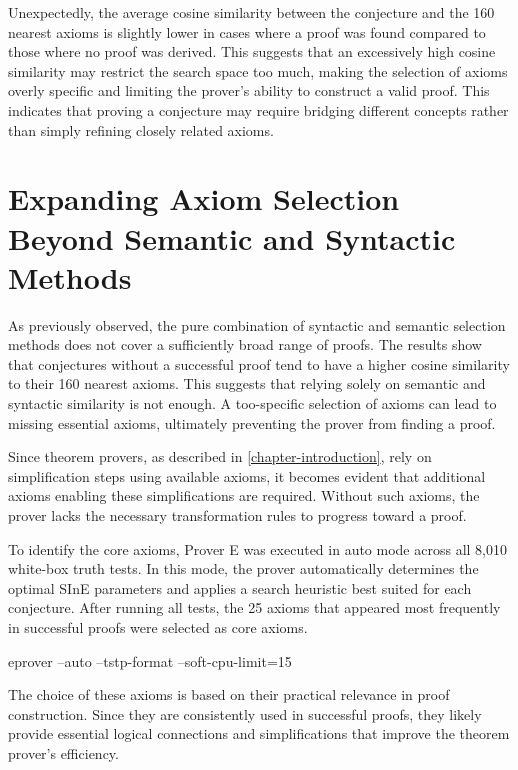 \documentclass[english,version-2020-11]{uzl-thesis}
\begin{document}
Unexpectedly, the average cosine similarity between the conjecture and the 160 nearest axioms is slightly lower in cases where a proof was found compared to those where no proof was derived. This suggests that an excessively high cosine similarity may restrict the search space too much, making the selection of axioms overly specific and limiting the prover's ability to construct a valid proof. This indicates that proving a conjecture may require bridging different concepts rather than simply refining closely related axioms.


\section{Expanding Axiom Selection Beyond Semantic and Syntactic Methods}

As previously observed, the pure combination of syntactic and semantic selection methods does not cover a sufficiently broad range of proofs. The results show that conjectures without a successful proof tend to have a higher cosine similarity to their 160 nearest axioms. This suggests that relying solely on semantic and syntactic similarity is not enough. A too-specific selection of axioms can lead to missing essential axioms, ultimately preventing the prover from finding a proof.

Since theorem provers, as described in \ref{chapter-introduction}, rely on simplification steps using available axioms, it becomes evident that additional axioms enabling these simplifications are required. Without such axioms, the prover lacks the necessary transformation rules to progress toward a proof.

To identify the core axioms, Prover E was executed in auto mode across all 8,010 white-box truth tests. In this mode, the prover automatically determines the optimal SInE parameters and applies a search heuristic best suited for each conjecture. After running all tests, the 25 axioms that appeared most frequently in successful proofs were selected as core axioms.

\begin{Pseudocode}[morekeywords = {add, create}, deletekeywords={to}, numbers=left,
    caption = {Prover E configuration}]
    eprover --auto --tstp-format --soft-cpu-limit=15
\end{Pseudocode}


The choice of these axioms is based on their practical relevance in proof construction. Since they are consistently used in successful proofs, they likely provide essential logical connections and simplifications that improve the theorem prover's efficiency.
\end{document}
